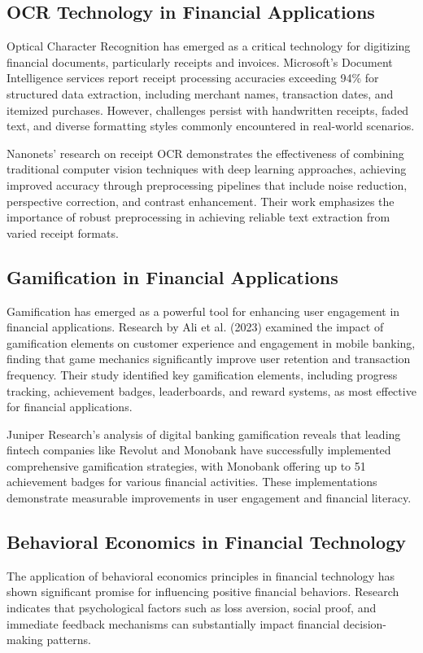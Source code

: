\documentclass[10pt,twocolumn,twoside,a4paper]{article}
\begin{document}
\subsection{OCR Technology in Financial Applications}
Optical Character Recognition has emerged as a critical technology for digitizing financial documents, particularly receipts and invoices. Microsoft's Document Intelligence services report receipt processing accuracies exceeding 94\% for structured data extraction, including merchant names, transaction dates, and itemized purchases. However, challenges persist with handwritten receipts, faded text, and diverse formatting styles commonly encountered in real-world scenarios.

Nanonets' research on receipt OCR demonstrates the effectiveness of combining traditional computer vision techniques with deep learning approaches, achieving improved accuracy through preprocessing pipelines that include noise reduction, perspective correction, and contrast enhancement. Their work emphasizes the importance of robust preprocessing in achieving reliable text extraction from varied receipt formats.

\subsection{Gamification in Financial Applications}
Gamification has emerged as a powerful tool for enhancing user engagement in financial applications. Research by Ali et al. (2023) examined the impact of gamification elements on customer experience and engagement in mobile banking, finding that game mechanics significantly improve user retention and transaction frequency. Their study identified key gamification elements, including progress tracking, achievement badges, leaderboards, and reward systems, as most effective for financial applications.

Juniper Research's analysis of digital banking gamification reveals that leading fintech companies like Revolut and Monobank have successfully implemented comprehensive gamification strategies, with Monobank offering up to 51 achievement badges for various financial activities. These implementations demonstrate measurable improvements in user engagement and financial literacy.

\subsection{Behavioral Economics in Financial Technology}
The application of behavioral economics principles in financial technology has shown significant promise for influencing positive financial behaviors. Research indicates that psychological factors such as loss aversion, social proof, and immediate feedback mechanisms can substantially impact financial decision-making patterns.
\end{document}
